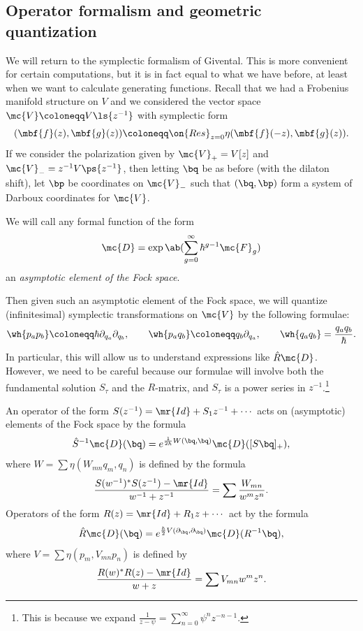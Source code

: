 \subsection{Operator formalism and geometric quantization}%
\label{sub:Operator formalism and geometric quantization}

We will return to the symplectic formalism of Givental. This is more convenient for certain computations, but it is in fact equal to what we have before, at least when we want to calculate generating functions. Recall that we had a Frobenius manifold structure on $V$ and we considered the vector space $\mc{V}\coloneqq V\ls{z^{-1}}$ with symplectic form
\[ (\mbf{f}(z), \mbf{g}(z)) \coloneqq \on{Res}_{z=0} \eta(\mbf{f}(-z), \mbf{g}(z)). \]
If we consider the polarization given by $\mc{V}_+ = V[z]$ and $\mc{V}_- = z^{-1}V\ps{z^{-1}}$, then letting $\bq$ be as before (with the dilaton shift), let $\bp$ be coordinates on $\mc{V}_-$ such that $(\bq, \bp)$ form a system of Darboux coordinates for $\mc{V}$.

\begin{defn}
    We will call any formal function of the form
    \[ \mc{D} = \exp\ab(\sum_{g=0}^{\infty} \hbar^{g-1} \mc{F}_g) \]
    an \textit{asymptotic element of the Fock space}.
\end{defn}

Then given such an asymptotic element of the Fock space, we will quantize (infinitesimal) symplectic transformations on $\mc{V}$ by the following formulae:
\[ \wh{p_a p_b} \coloneqq \hbar \partial_{q_a} \partial_{q_b}, \qquad \wh{p_a q_b} \coloneqq q_b \partial_{q_a}, \qquad \wh{q_a q_b} = \frac{q_a q_b}{\hbar}. \]
In particular, this will allow us to understand expressions like $\hat{R} \mc{D}$. However, we need to be careful because our formulae will involve both the fundamental solution $S_{\tau}$ and the $R$-matrix, and $S_{\tau}$ is a power series in $z^{-1}$.\footnote{This is because we expand $\frac{1}{z-\psi} = \sum_{n=0}^{\infty} \psi^n z^{-n-1}$.}

\begin{thm}
    An operator of the form $S(z^{-1}) = \mr{Id} + S_1 z^{-1} + \cdots$ acts on (asymptotic) elements of the Fock space by the formula
    \[ \hat{S}^{-1} \mc{D}(\bq) = e^{\frac{1}{2\hbar}W(\bq,\bq)} \mc{D}([S \bq]_+), \]
    where $W = \sum \eta(W_{mn}q_m, q_n)$ is defined by the formula
    \[ \frac{S(w^{-1})^* S(z^{-1}) - \mr{Id}}{w^{-1}+z^{-1}} = \sum \frac{W_{mn}}{w^m z^n}. \]
    Operators of the form $R(z) = \mr{Id} + R_1 z + \cdots$ act by the formula
    \[ \hat{R}\mc{D}(\bq) = e^{\frac{\hbar}{2} V(\partial_{\bq}, \partial_{\bq})} \mc{D}(R^{-1} \bq), \]
    where $V = \sum \eta(p_m, V_{mn} p_n)$ is defined by 
    \[ \frac{R(w)^* R(z) - \mr{Id}}{w+z} = \sum V_{mn} w^m z^n. \]
\end{thm}

